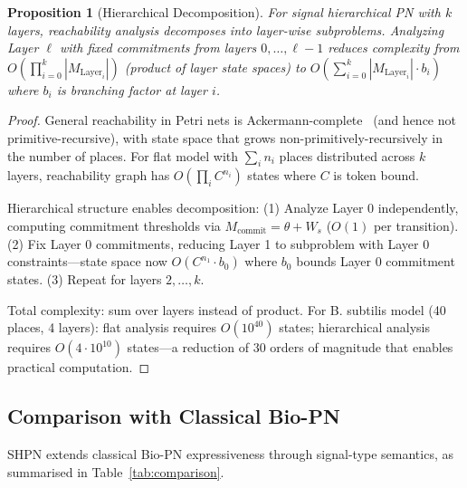\documentclass[10pt,letterpaper]{article}
\newtheorem{proposition}{Proposition}
\begin{document}
\begin{proposition}[Hierarchical Decomposition]
For signal hierarchical PN with $k$ layers, reachability analysis decomposes into layer-wise subproblems. Analyzing Layer $\ell$ with fixed commitments from layers $0, \ldots, \ell-1$ reduces complexity from $O(\prod_{i=0}^{k} |M_{\text{Layer}_i}|)$ (product of layer state spaces) to $O(\sum_{i=0}^{k} |M_{\text{Layer}_i}| \cdot b_i)$ where $b_i$ is branching factor at layer $i$.
\end{proposition}

\begin{proof}
General reachability in Petri nets is Ackermann-complete~\cite{czerwinski2021} (and hence not primitive-recursive), with state space that grows non-primitively-recursively in the number of places. For flat model with $\sum_i n_i$ places distributed across $k$ layers, reachability graph has $O(\prod_i C^{n_i})$ states where $C$ is token bound.

Hierarchical structure enables decomposition: (1) Analyze Layer 0 independently, computing commitment thresholds via $M_{\text{commit}} = \theta + W_s$ ($O(1)$ per transition). (2) Fix Layer 0 commitments, reducing Layer 1 to subproblem with Layer 0 constraints---state space now $O(C^{n_1} \cdot b_0)$ where $b_0$ bounds Layer 0 commitment states. (3) Repeat for layers $2, \ldots, k$.

Total complexity: sum over layers instead of product. For B. subtilis model (40 places, 4 layers): flat analysis requires $O(10^{40})$ states; hierarchical analysis requires $O(4 \cdot 10^{10})$ states---a reduction of 30 orders of magnitude that enables practical computation.
\end{proof}

\subsection{Comparison with Classical Bio-PN}

SHPN extends classical Bio-PN expressiveness through signal-type semantics, as summarised in Table~\ref{tab:comparison}.
\end{document}
